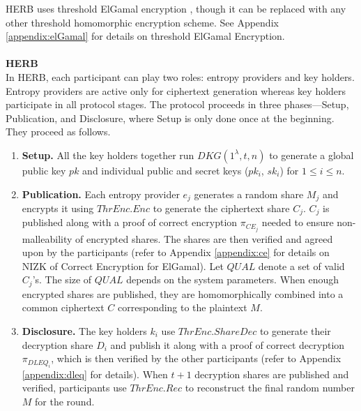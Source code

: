 \documentclass[letterpaper,twocolumn,10pt]{article}
\theoremstyle{definition}
\theoremstyle{remark}
\begin{document}
 HERB \cite{cherniaeva2019homomorphic} uses threshold ElGamal encryption \cite{desmedt1990Threshold}, though it can be replaced with any other threshold homomorphic encryption scheme. See Appendix \ref{appendix:elGamal} for details on threshold ElGamal Encryption.\\\\
\textbf{HERB}\\
In HERB, each participant can play two roles: entropy providers and key holders. Entropy providers are active only for ciphertext generation whereas key holders participate in all protocol stages. The protocol proceeds in three phases---Setup, Publication, and Disclosure, where Setup is only done once at the beginning. They proceed as follows.
\begin{enumerate}
    \item \textbf{Setup.} All the key holders together run $DKG(1^\lambda, t, n)$ to generate a global public key $pk$ and individual public and secret keys ($pk_i$, $sk_i$) for $1 \le i \le n$.
    
    \item \textbf{Publication.} Each entropy provider $e_j$ generates a random share $M_j$ and encrypts it using $ThrEnc.Enc$ to generate the ciphertext share $C_j$. $C_j$ is published along with a proof of correct encryption $\pi_{CE_{j}}$ needed to ensure non-malleability of encrypted shares. The shares are then verified and agreed upon by the participants (refer to Appendix \ref{appendix:ce} for details on NIZK of Correct Encryption for ElGamal). Let $QUAL$ denote a set of valid $C_j$'s. The size of $QUAL$ depends on the system parameters. When enough encrypted shares are published, they are homomorphically combined into a common ciphertext $C$ corresponding to the plaintext $M$.
    
    \item \textbf{Disclosure.} The key holders $k_i$ use $ThrEnc.ShareDec$ to generate their decryption share $D_i$ and publish it along with a proof of correct decryption $\pi_{DLEQ_{i}}$, which is then verified by the other participants (refer to Appendix \ref{appendix:dleq} for details). When $t+1$ decryption shares are published and verified, participants use $ThrEnc.Rec$ to reconstruct the final random number $M$ for the round.
\end{enumerate}
\end{document}
